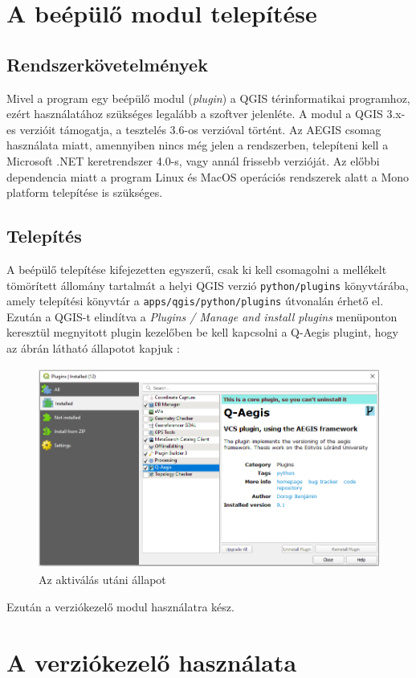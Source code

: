 \section{A beépülő modul telepítése}
\subsection{Rendszerkövetelmények}
Mivel a program egy beépülő modul (\emph{plugin}) a QGIS térinformatikai programhoz, ezért használatához szükséges legalább a szoftver jelenléte. A modul a QGIS 3.x-es verzióit támogatja, a tesztelés 3.6-os verzióval történt. Az AEGIS csomag használata miatt, amennyiben nincs még jelen a rendszerben, telepíteni kell a Microsoft .NET keretrendszer 4.0-s, vagy annál frissebb verzióját. Az előbbi dependencia miatt a program Linux és MacOS operációs rendszerek alatt a Mono platform telepítése is szükséges. 
\subsection{Telepítés}
A beépülő telepítése kifejezetten egyszerű, csak ki kell csomagolni a mellékelt tömörített állomány tartalmát a helyi QGIS verzió \texttt{python/plugins} könyvtárába, amely telepítési könyvtár a \texttt{apps/qgis/python/plugins} útvonalán érhető el. Ezután a QGIS-t elindítva a \emph{Plugins / Manage and install plugins} menüponton keresztül megnyitott plugin kezelőben be kell kapcsolni a Q-Aegis plugint, hogy az ábrán látható állapotot kapjuk :
\begin{figure}[H]
	\centering
	\includegraphics[width=\textwidth,height=250px]{images/enable_plugin}
	\caption{Az aktiválás utáni állapot}
	\label{fig:picture-1}
\end{figure}

Ezután a verziókezelő modul használatra kész.
	
\section{A verziókezelő használata}
